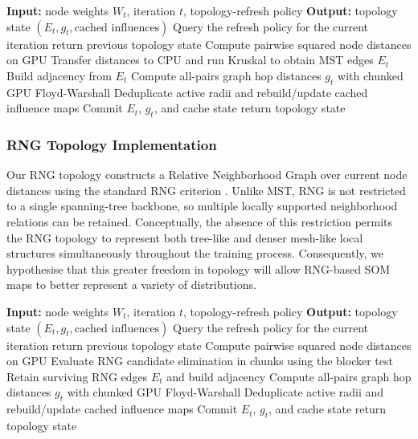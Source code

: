 \documentclass[10pt]{article} %
\begin{document}
\begin{algorithm}[H]
\caption{Dynamic MST topology update with refresh-triggered recomputation and cached influence reuse.}
\begin{algorithmic}[1]
\State \textbf{Input:} node weights $W_t$, iteration $t$, topology-refresh policy
\State \textbf{Output:} topology state $(E_t, g_t, \text{cached influences})$
\State Query the refresh policy for the current iteration
\State return previous topology state
\EndIf
\State Compute pairwise squared node distances on GPU
\State Transfer distances to CPU and run Kruskal to obtain MST edges $E_t$
\State Build adjacency from $E_t$
\State Compute all-pairs graph hop distances $g_t$ with chunked GPU Floyd-Warshall
\State Deduplicate active radii and rebuild/update cached influence maps
\State Commit $E_t$, $g_t$, and cache state
\State return topology state
\end{algorithmic}
\end{algorithm}

\subsubsection{RNG Topology Implementation}

Our RNG topology constructs a Relative Neighborhood Graph over current node distances using the standard RNG criterion \citep{toussaintRelativeNeighbourhoodGraph1980}. Unlike MST, RNG is not restricted to a single spanning-tree backbone, so multiple locally supported neighborhood relations can be retained. Conceptually, the absence of this restriction permits the RNG topology to represent both tree-like and denser mesh-like local structures simultaneously throughout the training process. Consequently, we hypothesise that this greater freedom in topology will allow RNG-based SOM maps to better represent a variety of distributions.

\begin{algorithm}[H]
\caption{Dynamic RNG topology update with refresh-triggered recomputation and cached influence reuse.}
\begin{algorithmic}[1]
\State \textbf{Input:} node weights $W_t$, iteration $t$, topology-refresh policy
\State \textbf{Output:} topology state $(E_t, g_t, \text{cached influences})$
\State Query the refresh policy for the current iteration
\State return previous topology state
\EndIf
\State Compute pairwise squared node distances on GPU
\State Evaluate RNG candidate elimination in chunks using the blocker test
\State Retain surviving RNG edges $E_t$ and build adjacency
\State Compute all-pairs graph hop distances $g_t$ with chunked GPU Floyd-Warshall
\State Deduplicate active radii and rebuild/update cached influence maps
\State Commit $E_t$, $g_t$, and cache state
\State return topology state
\end{algorithmic}
\end{algorithm}
\end{document}
